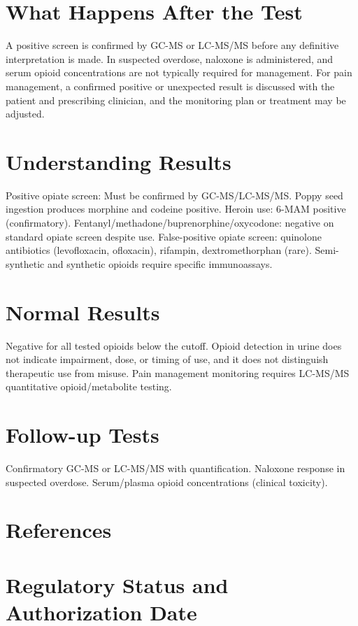 \section*{What Happens After the Test}
A positive screen is confirmed by GC-MS or LC-MS/MS before any definitive interpretation is made. In suspected overdose, naloxone is administered, and serum opioid concentrations are not typically required for management. For pain management, a confirmed positive or unexpected result is discussed with the patient and prescribing clinician, and the monitoring plan or treatment may be adjusted.
\section*{Understanding Results}
Positive opiate screen: Must be confirmed by GC-MS/LC-MS/MS. Poppy seed ingestion produces morphine and codeine positive. Heroin use: 6-MAM positive (confirmatory). Fentanyl/methadone/buprenorphine/oxycodone: negative on standard opiate screen despite use. False-positive opiate screen: quinolone antibiotics (levofloxacin, ofloxacin), rifampin, dextromethorphan (rare). Semi-synthetic and synthetic opioids require specific immunoassays.
\section*{Normal Results}
Negative for all tested opioids below the cutoff. Opioid detection in urine does not indicate impairment, dose, or timing of use, and it does not distinguish therapeutic use from misuse. Pain management monitoring requires LC-MS/MS quantitative opioid/metabolite testing.
\section*{Follow-up Tests}
Confirmatory GC-MS or LC-MS/MS with quantification. Naloxone response in suspected overdose. Serum/plasma opioid concentrations (clinical toxicity).
\section*{References}



\clearpage
\section*{Regulatory Status and Authorization Date}

\clearpage
